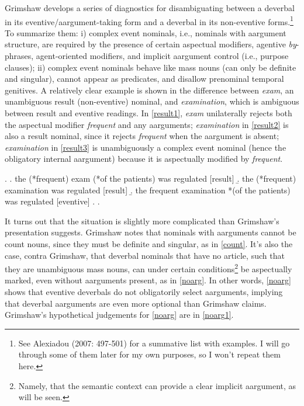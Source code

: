 \documentclass[12pt]{article}
\begin{document}
Grimshaw develops a series of diagnostics for disambiguating between a deverbal in its eventive/aargument-taking form and a deverbal in its non-eventive forms.\footnote{ See Alexiadou (2007: 497-501) for a summative list with examples. I will go through some of them later for my own purposes, so I won't repeat them here.} To summarize them: i) complex event nominals, i.e., nominals with aargument structure, are required by the presence of certain aspectual modifiers, agentive \textit{by}-phrases, agent-oriented modifiers, and implicit aargument control (i.e., purpose clauses); ii) complex event nominals behave like mass nouns (can only be definite and singular), cannot appear as predicates, and disallow prenominal temporal genitives. A relatively clear example is shown in the  difference between \textit{exam}, an unambiguous result (non-eventive) nominal, and \textit{examination}, which is ambiguous between result and eventive readings. In \ref{result1}, \textit{exam} unilaterally rejects both the aspectual modifier \textit{frequent} and any aarguments; \textit{examination} in \ref{result2} is also a result nominal, since it rejects \textit{frequent} when the aargument is absent; \textit{examination} in \ref{result3} is unambiguously a complex event nominal (hence the obligatory internal aargument) because it is aspectually modified by \textit{frequent}.

\singlespacing

\ex. \label{result}
\a. \label{result1} the (*frequent) exam (*of the patients) was regulated \hfill [result]
\b. \label{result2} the (*frequent) examination was regulated \hfill [result]
\b. \label{result3} the frequent examination *(of the patients) was regulated \hfill [eventive]
\z. \z. \par

\doublespacing

It turns out that the situation is slightly more complicated than Grimshaw's presentation suggests. Grimshaw notes that nominals with aarguments cannot be count nouns, since they must be definite and singular, as in \ref{count}. It's also the case, contra Grimshaw, that deverbal nominals that have no article, such that they are unambiguous mass nouns, can under certain conditions\footnote{ Namely, that the semantic context can provide a clear implicit aargument, as will be seen.} be aspectually marked, even without aarguments present, as in \ref{noarg}. In other words, \ref{noarg} shows that eventive deverbals do not obligatorily select aarguments, implying that deverbal aarguments are even more optional than Grimshaw claims. Grimshaw's hypothetical judgements for \ref{noarg} are in \ref{noarg1}.
\end{document}
